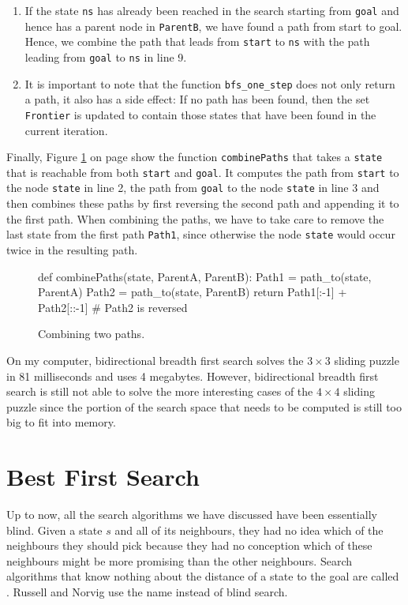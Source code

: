 \begin{enumerate}
      parent in line 7.
\item If the state \texttt{ns} has already been reached in the search starting from \texttt{goal} and hence has
      a parent node in \texttt{ParentB}, we have found a path from start to goal.  Hence, we combine the path that
      leads from \texttt{start} to \texttt{ns} with the path leading from \texttt{goal} to \texttt{ns} in line 9.
\item It is important to note that the function \texttt{bfs\_one\_step} does not only return a path, it also
      has a side effect: If no path has been found, then the set \texttt{Frontier} is updated to contain those
      states that have been found in the current iteration.
\end{enumerate}
Finally, Figure \ref{fig:combine-paths.stlx} on page \pageref{fig:combine-paths.stlx} show the function
\texttt{combinePaths} that takes a \texttt{state} that is reachable from both \texttt{start} and \texttt{goal}.
It computes the path from \texttt{start} to the node \texttt{state} in line 2, the path from \texttt{goal} to
the node \texttt{state} in line 3 and then combines these paths by first reversing the second path and
appending it to the first path.  When combining the paths, we have to take care to remove the last state from
the first path \texttt{Path1}, since otherwise the node \texttt{state} would occur twice in the resulting path.

\begin{figure}[!ht]
\centering
\begin{python3code}
    def combinePaths(state, ParentA, ParentB):
            Path1 = path_to(state, ParentA)
            Path2 = path_to(state, ParentB)
            return Path1[:-1] + Path2[::-1] # Path2 is reversed
\end{python3code}
\vspace*{-0.3cm}
\caption{Combining two paths.}
\label{fig:combine-paths.stlx}
\end{figure}
On my computer, bidirectional breadth first search solves the $3 \times 3$ sliding puzzle in 81
milliseconds and uses 4 megabytes.  However, bidirectional breadth first search is still not able to solve the
more interesting cases of the $4 \times 4$ sliding puzzle since the portion of the search space that needs to
be computed is still too big to fit into memory. 

\section{Best First Search}
Up to now, all the search algorithms we have discussed have been essentially blind.  Given a state $s$ and
all of its neighbours, they had no idea which of the neighbours they should pick because they had no conception
which of these neighbours might be more promising than the other neighbours.  Search algorithms that know nothing
about the distance of a state to the goal are called .  
Russell and Norvig \cite{russell:2020} use the name  instead of blind search.

